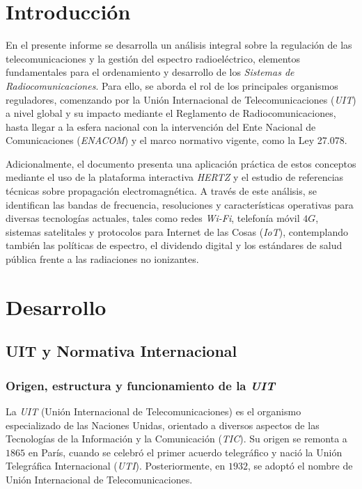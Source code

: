 \documentclass[12pt]{article}
\begin{document}
\tableofcontents
\newpage



\section{Introducción}
\label{sec_1}
En el presente informe se desarrolla un análisis integral sobre la regulación de las telecomunicaciones y la gestión del espectro radioeléctrico, elementos fundamentales para el ordenamiento y desarrollo de los \textit{Sistemas de Radiocomunicaciones}. Para ello, se aborda el rol de los principales organismos reguladores, comenzando por la Unión Internacional de Telecomunicaciones (\textit{UIT}) a nivel global y su impacto mediante el Reglamento de Radiocomunicaciones, hasta llegar a la esfera nacional con la intervención del Ente Nacional de Comunicaciones (\textit{ENACOM}) y el marco normativo vigente, como la Ley 27.078.

Adicionalmente, el documento presenta una aplicación práctica de estos conceptos mediante el uso de la plataforma interactiva \textit{HERTZ} y el estudio de referencias técnicas sobre propagación electromagnética. A través de este análisis, se identifican las bandas de frecuencia, resoluciones y características operativas para diversas tecnologías actuales, tales como redes \textit{Wi-Fi}, telefonía móvil $4G$, sistemas satelitales y protocolos para Internet de las Cosas (\textit{IoT}), contemplando también las políticas de espectro, el dividendo digital y los estándares de salud pública frente a las radiaciones no ionizantes.



\section{Desarrollo}
\label{sec_2}
\subsection{UIT y Normativa Internacional}
\label{sec_2.1}
\subsubsection{Origen, estructura y funcionamiento de la \textit{UIT}}
\label{sec_2.1.1}
La \textit{UIT} (Unión Internacional de Telecomunicaciones) es el organismo especializado de las Naciones Unidas, orientado a diversos aspectos de las Tecnologías de la Información y la Comunicación (\textit{TIC}). Su origen se remonta a $1865$ en París, cuando se celebró el primer acuerdo telegráfico y nació la Unión Telegráfica Internacional (\textit{UTI}). Posteriormente, en $1932$, se adoptó el nombre de Unión Internacional de Telecomunicaciones. \cite[p. 4]{b1}
\end{document}
